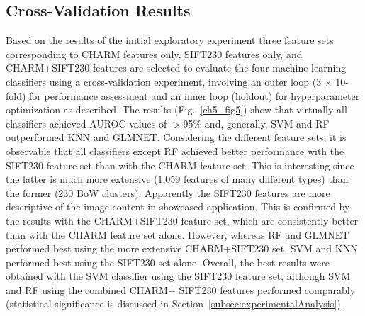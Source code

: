 \subsection{Cross-Validation Results}
\label{subsec:baselineResults}
Based on the results of the initial exploratory experiment three feature sets corresponding to CHARM features only, SIFT230 features only, and CHARM+SIFT230 features are selected to evaluate the four machine learning classifiers using a cross-validation experiment, involving an outer loop (3 $\times$ 10-fold) for performance assessment and an inner loop (holdout) for hyperparameter optimization as described. The results (Fig.~\ref{ch5_fig5}) show that virtually all classifiers achieved AUROC values of $>$95\% and, generally, SVM and RF outperformed KNN and GLMNET. Considering the different feature sets, it is observable that all classifiers except RF achieved better performance with the SIFT230 feature set than with the CHARM feature set. This is interesting since the latter is much more extensive (1,059 features of many different types) than the former (230 BoW clusters). Apparently the SIFT230 features are more descriptive of the image content in showcased application. This is confirmed by the results with the CHARM+SIFT230 feature set, which are consistently better than with the CHARM feature set alone. However, whereas RF and GLMNET performed best using the more extensive CHARM+SIFT230 set, SVM and KNN performed best using the SIFT230 set alone. Overall, the best results were obtained with the SVM classifier using the SIFT230 feature set, although SVM and RF using the combined CHARM+ SIFT230 features performed comparably (statistical significance is discussed in Section~\ref{subsec:experimentalAnalysis}).
